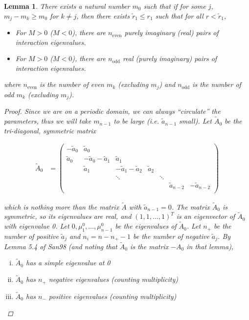 \documentclass[12pt]{article}
\newtheorem{lemma}{Lemma}
\begin{document}
\begin{lemma}\label{inteigsparity}
There exists a natural number $m_0$ such that if for some $j$, $m_j - m_k \geq m_0$ for $k \neq j$, then there exists $\tilde{r}_1 \leq r_1$ such that for all $r < \tilde{r}_1$, 

\begin{itemize}
\item For $M > 0$ ($M < 0$), there are $n_{\text{even}}$ purely imaginary (real) pairs of interaction eigenvalues.
\item For $M > 0$ ($M < 0$), there are $n_{\text{odd}}$ real (purely imaginary) pairs of interaction eigenvalues.
\end{itemize}

where $n_{\text{even}}$ is the number of even $m_k$ (excluding $m_j$) and $n_{\text{odd}}$ is the number of odd $m_k$ (excluding $m_j$).

\begin{proof}
Since we are on a periodic domain, we can always ``circulate'' the parameters, thus we will take $m_{n-1}$ to be large (i.e. $\tilde{a}_{n-1}$ small). Let $\tilde{A}_0$ be the tri-diagonal, symmetric matrix 

\begin{align*}
\tilde{A}_0 &= \begin{pmatrix}
-\tilde{a}_0 & \tilde{a}_0 \\
\tilde{a}_0 & -\tilde{a}_0 - \tilde{a}_1 &  \tilde{a}_1 \\
& \tilde{a}_1 & -\tilde{a}_1 - \tilde{a}_2 &  \tilde{a}_2 \\
& & \ddots & & \ddots \\
& & & & & \tilde{a}_{n-2} & -\tilde{a}_{n-2} \\
\end{pmatrix}
\end{align*}

which is nothing more than the matrix $\tilde{A}$ with $\tilde{a}_{n-1} = 0$. The matrix $\tilde{A}_0$ is symmetric, so its eigenvalues are real, and $(1, 1, \dots, 1)^T$ is an eigenvector of $\tilde{A}_0$ with eigenvalue 0. Let $0, \mu^0_1, \dots, \mu^0_{n-1}$ be the eigenvalues of $\tilde{A}_0$. Let $n_+$ be the number of positive $\tilde{a}_j$ and $n_i = n - n_+ - 1$ be the number of negative $\tilde{a}_j$. By Lemma 5.4 of San98 (and noting that $\tilde{A}_0$ is the matrix $-A_0$ in that lemma),

\begin{enumerate}[(i)]
\item $\tilde{A}_0$ has a simple eigenvalue at 0
\item $\tilde{A}_0$ has $n_+$ negative eigenvalues (counting multiplicity)
\item $\tilde{A}_0$ has $n_-$ positive eigenvalues (counting multiplicity)
\end{enumerate}


\end{proof}
\end{lemma}
\end{document}
